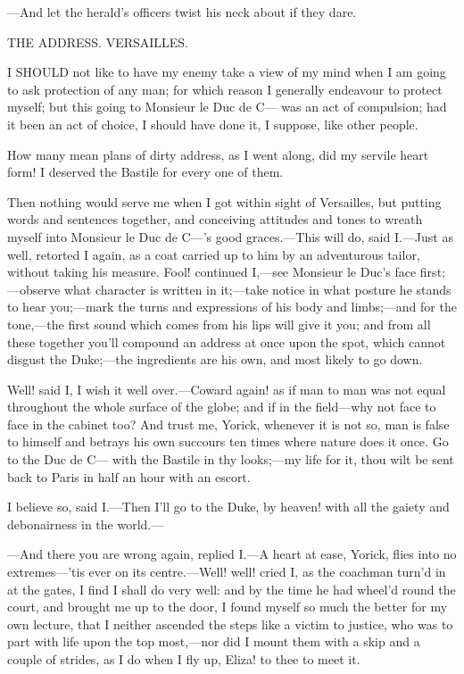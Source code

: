 \documentclass[twoside]{article}
\begin{document}
—And let the herald’s officers twist his neck about if they dare.




THE ADDRESS.
VERSAILLES.


I SHOULD not like to have my enemy take a view of my mind when I am going
to ask protection of any man; for which reason I generally endeavour to
protect myself; but this going to Monsieur le Duc de C— was an act of
compulsion; had it been an act of choice, I should have done it, I
suppose, like other people.

How many mean plans of dirty address, as I went along, did my servile
heart form!  I deserved the Bastile for every one of them.

Then nothing would serve me when I got within sight of Versailles, but
putting words and sentences together, and conceiving attitudes and tones
to wreath myself into Monsieur le Duc de C—’s good graces.—This will do,
said I.—Just as well, retorted I again, as a coat carried up to him by an
adventurous tailor, without taking his measure.  Fool! continued I,—see
Monsieur le Duc’s face first;—observe what character is written in
it;—take notice in what posture he stands to hear you;—mark the turns and
expressions of his body and limbs;—and for the tone,—the first sound
which comes from his lips will give it you; and from all these together
you’ll compound an address at once upon the spot, which cannot disgust
the Duke;—the ingredients are his own, and most likely to go down.

Well! said I, I wish it well over.—Coward again! as if man to man was not
equal throughout the whole surface of the globe; and if in the field—why
not face to face in the cabinet too?  And trust me, Yorick, whenever it
is not so, man is false to himself and betrays his own succours ten times
where nature does it once.  Go to the Duc de C— with the Bastile in thy
looks;—my life for it, thou wilt be sent back to Paris in half an hour
with an escort.

I believe so, said I.—Then I’ll go to the Duke, by heaven! with all the
gaiety and debonairness in the world.—

—And there you are wrong again, replied I.—A heart at ease, Yorick, flies
into no extremes—’tis ever on its centre.—Well! well! cried I, as the
coachman turn’d in at the gates, I find I shall do very well: and by the
time he had wheel’d round the court, and brought me up to the door, I
found myself so much the better for my own lecture, that I neither
ascended the steps like a victim to justice, who was to part with life
upon the top most,—nor did I mount them with a skip and a couple of
strides, as I do when I fly up, Eliza! to thee to meet it.
\end{document}
